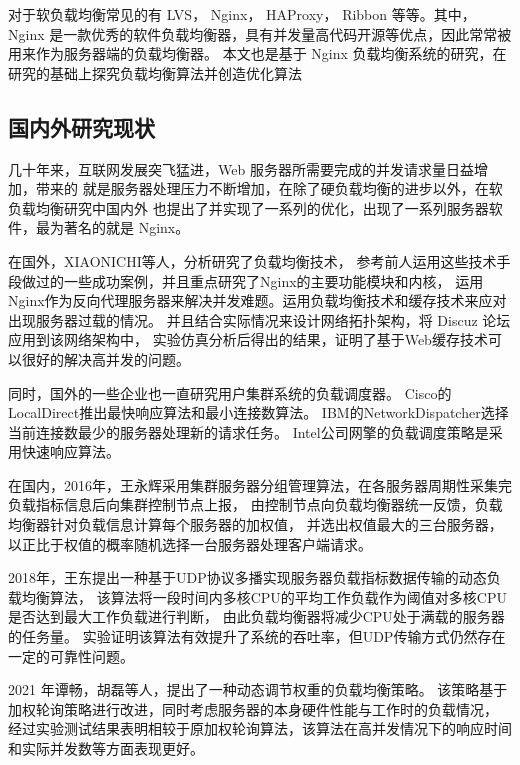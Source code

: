 对于软负载均衡常见的有 LVS\cite{lijp}， Nginx\cite{Zepeng}， HAProxy\cite{li2019dynamic}， Ribbon 等等。其中，Nginx 是一款优秀的软件负载均衡器，具有并发量高代码开源等优点，因此常常被用来作为服务器端的负载均衡器。
本文也是基于 Nginx 负载均衡系统的研究，在研究的基础上探究负载均衡算法并创造优化算法

\subsection{国内外研究现状}

几十年来，互联网发展突飞猛进，Web 服务器所需要完成的并发请求量日益增加，带来的
就是服务器处理压力不断增加，在除了硬负载均衡的进步以外，在软负载均衡研究中国内外
也提出了并实现了一系列的优化，出现了一系列服务器软件，最为著名的就是 Nginx。

在国外，XIAONICHI等人\cite{chi2012web}，分析研究了负载均衡技术，
参考前人运用这些技术手段做过的一些成功案例，并且重点研究了Nginx的主要功能模块和内核，
运用Nginx作为反向代理服务器来解决并发难题。运用负载均衡技术和缓存技术来应对出现服务器过载的情况。
并且结合实际情况来设计网络拓扑架构，将 Discuz 论坛应用到该网络架构中，
实验仿真分析后得出的结果，证明了基于Web缓存技术可以很好的解决高并发的问题。

同时，国外的一些企业也一直研究用户集群系统的负载调度器。
Cisco的LocalDirect推出最快响应算法和最小连接数算法。
IBM的NetworkDispatcher选择当前连接数最少的服务器处理新的请求任务。
Intel公司网擎的负载调度策略是采用快速响应算法\cite{张淇2020服务器集群负载均衡算法在商务系统中的研究与应用}。

在国内，2016年，王永辉采用集群服务器分组管理算法，在各服务器周期性采集完负载指标信息后向集群控制节点上报，
由控制节点向负载均衡器统一反馈，负载均衡器针对负载信息计算每个服务器的加权值，
并选出权值最大的三台服务器，以正比于权值的概率随机选择一台服务器处理客户端请求\cite{王永辉2015基于}。

2018年，王东提出一种基于UDP协议多播实现服务器负载指标数据传输的动态负载均衡算法，
该算法将一段时间内多核CPU的平均工作负载作为阈值对多核CPU是否达到最大工作负载进行判断，
由此负载均衡器将减少CPU处于满载的服务器的任务量\cite{王东2018动态反馈负载均衡策略的研究}。
实验证明该算法有效提升了系统的吞吐率，但UDP传输方式仍然存在一定的可靠性问题。

2021 年谭畅，胡磊等人\cite{谭畅2021云中心基于}，提出了一种动态调节权重的负载均衡策略。
该策略基于加权轮询策略进行改进，同时考虑服务器的本身硬件性能与工作时的负载情况，
经过实验测试结果表明相较于原加权轮询算法，该算法在高并发情况下的响应时间
和实际并发数等方面表现更好。


